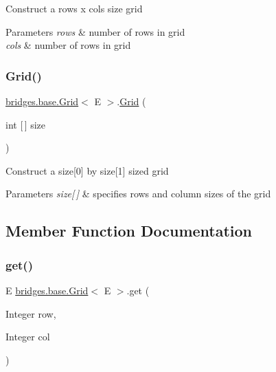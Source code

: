 Construct a rows x cols size grid


\begin{DoxyParams}{Parameters}
{\em rows} & number of rows in grid \\
\hline
{\em cols} & number of rows in grid \\
\hline
\end{DoxyParams}
\mbox{\label{classbridges_1_1base_1_1_grid_ab9975b28d8dda7f3fbe0e35a7a026772}} 
\subsubsection{\texorpdfstring{Grid()}{Grid()}\hspace{0.1cm}{\footnotesize\ttfamily [4/4]}}
{\footnotesize\ttfamily \mbox{\hyperlink{classbridges_1_1base_1_1_grid}{bridges.\+base.\+Grid}}$<$ E $>$.\mbox{\hyperlink{classbridges_1_1base_1_1_grid}{Grid}} (\begin{DoxyParamCaption}\item[{int \mbox{[}$\,$\mbox{]}}]{size }\end{DoxyParamCaption})}

Construct a size\mbox{[}0\mbox{]} by size\mbox{[}1\mbox{]} sized grid 
\begin{DoxyParams}{Parameters}
{\em size\mbox{[}$\,$\mbox{]}} & specifies rows and column sizes of the grid \\
\hline
\end{DoxyParams}


\subsection{Member Function Documentation}
\mbox{\label{classbridges_1_1base_1_1_grid_a698579bb5b7166f76a18a1b04916e090}} 
\subsubsection{\texorpdfstring{get()}{get()}}
{\footnotesize\ttfamily E \mbox{\hyperlink{classbridges_1_1base_1_1_grid}{bridges.\+base.\+Grid}}$<$ E $>$.get (\begin{DoxyParamCaption}\item[{Integer}]{row,  }\item[{Integer}]{col }\end{DoxyParamCaption})}

